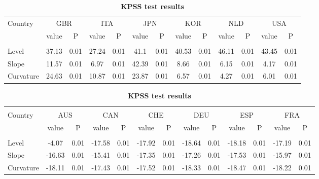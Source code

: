 \documentclass[12pt,bibliography=totoc]{article}
\begin{document}
\begin{appendices}
\begin{table}
\begin{subtable}[t]{1\textwidth}
\begin{tabular}{l cc cc cc cc cc cc}
Country	&	\multicolumn{2}{c}{GBR}			&	\multicolumn{2}{c}{ITA}			&	\multicolumn{2}{c}{JPN}			&	\multicolumn{2}{c}{KOR}			&	\multicolumn{2}{c}{NLD}			&	\multicolumn{2}{c}{USA}			\\

 & value &P & value &P& value &P & value &P& value &P & value &P\\

\hline       \\ [-1.5ex] 

Level	&	37.13 & 0.01 & 27.24 & 0.01 & 41.1 & 0.01 & 40.53 & 0.01 & 46.11 & 0.01 & 43.45 & 0.01	\\
Slope	&	11.57 & 0.01 & 6.97 & 0.01 & 42.39 & 0.01 & 8.66 & 0.01 & 6.15 & 0.01 & 4.17 & 0.01	\\
Curvature	&	24.63 & 0.01 & 10.87 & 0.01 & 23.87 & 0.01 & 6.57 & 0.01 & 4.27 & 0.01 & 6.01 & 0.01	\\


\hline
\end{tabular}
\caption{\textbf{KPSS test results}}

\end{subtable}
\hspace{\fill}
\bigskip

\begin{subtable}[t]{1\textwidth}
\centering
\begin{tabular}{l cc cc cc cc cc cc}%
\hline\hline \\ [-1.5ex]                         %

Country	&	\multicolumn{2}{c}{AUS}			&	\multicolumn{2}{c}{CAN}			&	\multicolumn{2}{c}{CHE}			&	\multicolumn{2}{c}{DEU}			&	\multicolumn{2}{c}{ESP}			&	\multicolumn{2}{c}{FRA}			\\[0.5ex] 

 & value &P & value &P& value &P & value &P& value &P & value &P\\

\hline       \\ [-1.5ex] 

Level	&	-4.07 & 0.01 & -17.58 & 0.01 & -17.92 & 0.01 & -18.64 & 0.01 & -18.18 & 0.01 & -17.19 & 0.01	\\
Slope	&	-16.63 & 0.01 & -15.41 & 0.01 & -17.35 & 0.01 & -17.26 & 0.01 & -17.53 & 0.01 & -15.97 & 0.01	\\
Curvature	& -18.11 & 0.01 & -17.43 & 0.01 & -17.52 & 0.01 & -18.33 & 0.01 & -18.47 & 0.01 & -18.22 & 0.01	\\



\end{tabular}
\end{subtable}
\end{table}
\end{appendices}
\end{document}

